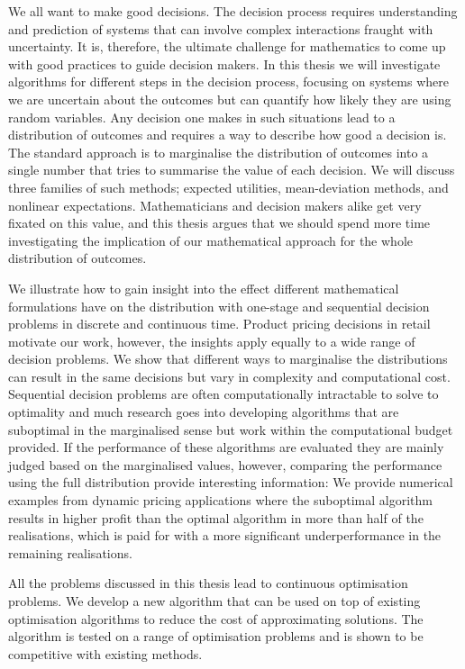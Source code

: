 \documentclass[main.tex]{subfiles}
\begin{document}
We all want to make good decisions. The decision
process requires understanding and prediction of systems that can
involve complex interactions fraught with uncertainty. It is, therefore,
the ultimate challenge for mathematics to come up with good practices
to guide decision makers.  In this thesis we will investigate
algorithms for different steps in the decision process, focusing on
systems where we are uncertain about the outcomes but can quantify how
likely they are using random variables.  Any decision one makes in
such situations lead to a distribution of outcomes and requires a way
to describe how good a decision is.  The standard approach is to
marginalise the distribution of outcomes into a single number that
tries to summarise the value of each decision.  We will discuss three
families of such methods; expected utilities, mean-deviation methods,
and nonlinear expectations.  Mathematicians and decision makers alike
get very fixated on this value, and this thesis argues that we should
spend more time investigating the implication of our mathematical
approach for the whole distribution of outcomes.

We illustrate how to gain insight into the effect different mathematical
formulations have on the distribution with one-stage and sequential
decision problems in discrete and continuous time. Product pricing
decisions in retail motivate our work, however, the insights
apply equally to a wide range of decision problems.  We show that
different ways to marginalise the distributions can result in the same
decisions but vary in complexity and computational
cost. Sequential decision problems are often computationally
intractable to solve to optimality and much research goes into
developing algorithms that are suboptimal in the marginalised sense
but work within the computational budget provided. If the performance
of these algorithms are evaluated they are mainly judged based on the
marginalised values, however, comparing the performance using the full
distribution provide interesting information: We provide numerical
examples from dynamic pricing applications where the suboptimal
algorithm results in higher profit than the optimal algorithm in more
than half of the realisations, which is paid for with a more significant
underperformance in the remaining realisations.

All the problems discussed in this thesis lead to continuous
optimisation problems. We develop a new algorithm that can be used on
top of existing optimisation algorithms to reduce the cost of
approximating solutions. The algorithm is tested on a range of
optimisation problems and is shown to be competitive with existing
methods.
\thispagestyle{empty}
\end{document}
